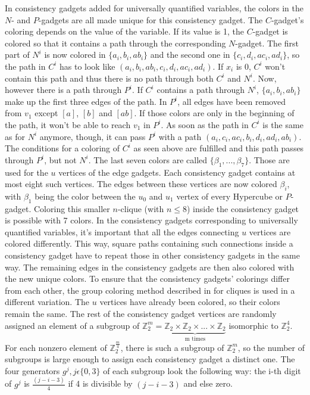 \documentclass[12pt,a4paper]{article}
\begin{document}
\newline
In consistency gadgets added for universally quantified variables, the colors in the $N$- and $P$-gadgets are all made unique for this consistency gadget. The $C$-gadget's coloring depends on the value of the variable. If its value is 1, the $C$-gadget is colored so that it contains a path through the corresponding $N$-gadget. The first part of $N^i$ is now colored in $ \{a_i, b_i, ab_i \}$ and the second one in $ \{c_i, d_i, ac_i, ad_i \}$, so the path in $C^i$ has to look like $(a_i, b_i, ab_i, c_i, d_i, ac_i, ad_i)$. If $x_i$ is 0, $C^i$ won't contain this path and thus there is no path through both $C^i$ and $N^i$. Now, however there is a path through $P^i$. If $C^i$ contains a path through $N^i$, $ \{a_i, b_i, ab_i \}$ make up the first three edges of the path. In $P^i$, all edges have been removed from $v_1$ except $[a]$, $[b]$ and $[ab]$. If those colors are only in the beginning of the path, it won't be able to reach $v_1$ in $P^i$. As soon as the path in $C^i$ is the same as for $N^i$ anymore, though, it can pass $P^i$ with a path $(a_i, c_i, ac_i, b_i, d_i, ad_i, ab_i)$. The conditions for a coloring of $C^i$ as seen above are fulfilled and this path passes through $P^i$, but not $N^i$.
\newline
The last seven colors are called $ \{ \beta_1, ..., \beta_7 \}$. Those are used for the $u$ vertices of the edge gadgets. Each consistency gadget contains at most eight such vertices. The edges between these vertices are now colored $\beta_i$, with $\beta_1$ being the color between the $u_0$ and $u_1$ vertex of every Hypercube or $P$-gadget. Coloring this smaller $n$-clique (with $n \leq 8$) inside the consistency gadget is possible with 7 colors. In the consistency gadgets corresponding to universally quantified variables, it's important that all the edges connecting $u$ vertices are colored differently. This way, square paths containing such connections inside a consistency gadget have to repeat those in other consistency gadgets in the same way.
\newline
The remaining edges in the consistency gadgets are then also colored with the new unique colors. To ensure that the consistency gadgets' colorings differ from each other, the group coloring method described in \citep{Alon2002} for cliques is used in a different variation. The $u$ vertices have already been colored, so their colors remain the same. The rest of the consistency gadget vertices are randomly assigned an element of a subgroup of $\mathbb{Z}^m_2 = \underbrace{\mathbb{Z}_2 \times \mathbb{Z}_2 \times ... \times \mathbb{Z}_2}_\text{m times}$ isomorphic to $\mathbb{Z}^4_2$. For each nonzero element of $\mathbb{Z}^{\frac{m}{4}}_2$, there is such a subgroup of $\mathbb{Z}^m_2$, so the number of subgroups is large enough to assign each consistency gadget a distinct one. The four generators $g^j, j \epsilon \{0,3 \}$ of each subgroup look the following way: the i-th digit of $g^j$ is $\frac{(j-i-3)}{4}$ if 4 is divisible by $(j-i-3)$ and else zero.
\end{document}
